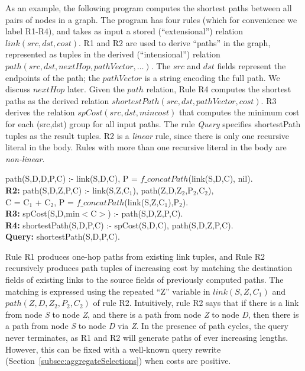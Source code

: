 As an example, the following program computes the shortest paths between
all pairs of nodes in a graph. The program has four rules (which for
convenience we label R1-R4), and takes as input a stored
(``extensional'') relation $link(src, dst, cost)$.  R1 and R2 are used
to derive ``paths'' in the graph, represented as tuples in the
derived (``intensional'') relation $path(src, dst, nextHop, pathVector, \ldots)$.  The $src$ and
$dst$ fields represent the endpoints of the path; the $pathVector$ is
a string encoding the full path. We discuss $nextHop$ later. Given the
$path$ relation, Rule R4
computes the shortest paths as the derived relation
$shortestPath(src, dst, pathVector, cost)$. R3
derives the relation $spCost(src, dst, mincost)$ that
computes the minimum cost for each (src,dst) group for all input paths.
The rule {\em Query} specifies shortestPath tuples as the result
tuples. R2 is a {\em linear} rule, since there is only one
recursive literal in the body. Rules with more than one recursive literal
in the body are {\em non-linear}.


\vspace{2pt} {\small
{} path(S,D,D,P,C) :- link(S,D,C), P = $f\_concatPath$(link(S,D,C), nil). \\
{\bf R2: } path(S,D,Z,P,C) :-
  link(S,Z,C$_{1}$), path(Z,D,Z$_{2}$,P$_{2}$,C$_{2}$),\\
\datalogspace C = C$_{1}$ + C$_{2}$, P = $f\_concatPath$(link(S,Z,C$_{1}$),P$_{2}$).\\
{\bf R3: } spCost(S,D,min$<$C$>$) :- path(S,D,Z,P,C).\\
{\bf R4: } shortestPath(S,D,P,C) :- spCost(S,D,C), path(S,D,Z,P,C).\\
{\bf Query: } shortestPath(S,D,P,C).
}
\vspace{2pt}

Rule R1 produces one-hop paths from existing link tuples, and Rule R2
recursively produces path tuples of increasing cost by matching the
destination fields of existing links to the source fields of previously
computed paths. The matching is expressed using the repeated ``Z'' variable in
$link(S,Z,C_{1})$ and $path(Z,D,Z_{2},P_{2},C_{2})$ of rule
R2. Intuitively, rule R2 says that if there is a link from node {\em S}
to node {\em Z}, and there is a path from node {\em Z} to node {\em D},
then there is a path from node {\em S} to node {\em D} via {\em Z}. In
the presence of path cycles, the query never 
terminates, as R1 and R2 will generate paths of ever increasing
lengths. However, this can be fixed with a well-known query rewrite 
(Section~\ref{subsec:aggregateSelections}) when costs are positive.%


